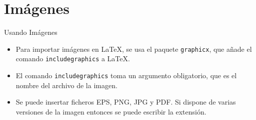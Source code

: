 \documentclass[12pt]{beamer}
\begin{document}
\section{Im\'agenes}
\begin{frame}{Usando Im\'agenes}
  \begin{itemize}
    \item Para importar im\'agenes en \LaTeX, se usa el paquete \texttt{\color{blue}graphicx},
     que añade el comando \texttt{\color{blue}includegraphics} a \LaTeX{}.
    \item<2-> El comando \texttt{\color{blue}includegraphics} toma un argumento obligatorio, que es el nombre del archivo de la imagen.
    \item<3-> Se puede insertar ficheros EPS, PNG, JPG y PDF. Si dispone de varias versiones de la imagen entonces se puede escribir la extensión.
  \end{itemize}
\end{frame}
\end{document}
